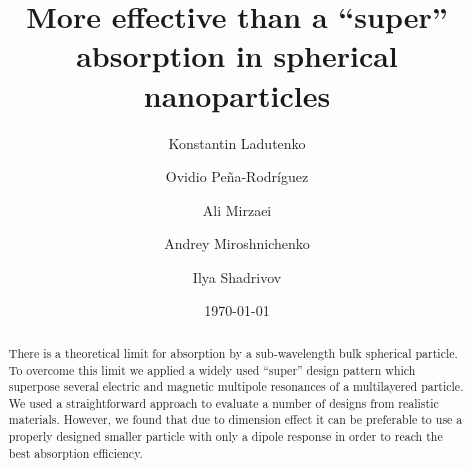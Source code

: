 \documentclass[aps,prl,twocolumn,showpacs,superscriptaddress,groupedaddress]{revtex4-1}
\begin{document}

\title{More effective than a ``super'' absorption in spherical nanoparticles}


\author{Konstantin Ladutenko} 


\author{Ovidio Pe\~{n}a-Rodr\'{i}guez} 


\author{Ali Mirzaei} 
\author{Andrey Miroshnichenko}
\author{Ilya Shadrivov}

\date{\today}

\begin{abstract}
  There is a theoretical limit for absorption by a sub-wavelength bulk
  spherical particle.  To overcome this limit we applied a widely used
  ``super'' design pattern which superpose several electric and
  magnetic multipole resonances of a multilayered particle.  We used a
  straightforward approach to evaluate a number of designs from realistic
  materials.  However, we found that due to dimension effect it can be
  preferable to use a properly designed smaller particle with only a
  dipole response in order to reach the best absorption efficiency.
\end{abstract}
\end{document}
